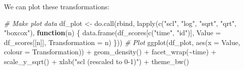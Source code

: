\documentclass[
  man,floatsintext]{apa6}
\newenvironment{Shaded}{\begin{snugshade}}{\end{snugshade}}
\newcommand{\AttributeTok}[1]{\textcolor[rgb]{0.77,0.63,0.00}{#1}}
\newcommand{\CommentTok}[1]{\textcolor[rgb]{0.56,0.35,0.01}{\textit{#1}}}
\newcommand{\ControlFlowTok}[1]{\textcolor[rgb]{0.13,0.29,0.53}{\textbf{#1}}}
\newcommand{\DecValTok}[1]{\textcolor[rgb]{0.00,0.00,0.81}{#1}}
\newcommand{\FunctionTok}[1]{\textcolor[rgb]{0.00,0.00,0.00}{#1}}
\newcommand{\NormalTok}[1]{#1}
\newcommand{\OtherTok}[1]{\textcolor[rgb]{0.56,0.35,0.01}{#1}}
\newcommand{\SpecialCharTok}[1]{\textcolor[rgb]{0.00,0.00,0.00}{#1}}
\newcommand{\StringTok}[1]{\textcolor[rgb]{0.31,0.60,0.02}{#1}}
\begin{document}
\begin{Shaded}
\end{Shaded}

We can plot these transformations:

\begin{Shaded}
\begin{Highlighting}[]
\CommentTok{\# Make plot data}
\NormalTok{df\_plot }\OtherTok{\textless{}{-}} \FunctionTok{do.call}\NormalTok{(rbind, }\FunctionTok{lapply}\NormalTok{(}\FunctionTok{c}\NormalTok{(}\StringTok{"scl"}\NormalTok{, }\StringTok{"log"}\NormalTok{, }\StringTok{"sqrt"}\NormalTok{, }\StringTok{"qrt"}\NormalTok{,}
    \StringTok{"boxcox"}\NormalTok{), }\ControlFlowTok{function}\NormalTok{(n) \{}
    \FunctionTok{data.frame}\NormalTok{(df\_scores[}\FunctionTok{c}\NormalTok{(}\StringTok{"time"}\NormalTok{, }\StringTok{"id"}\NormalTok{)], }\AttributeTok{Value =}\NormalTok{ df\_scores[[n]],}
        \AttributeTok{Transformation =}\NormalTok{ n)}
\NormalTok{\}))}
\CommentTok{\# Plot}
\FunctionTok{ggplot}\NormalTok{(df\_plot, }\FunctionTok{aes}\NormalTok{(}\AttributeTok{x =}\NormalTok{ Value, }\AttributeTok{colour =}\NormalTok{ Transformation)) }\SpecialCharTok{+} \FunctionTok{geom\_density}\NormalTok{() }\SpecialCharTok{+}
    \FunctionTok{facet\_wrap}\NormalTok{(}\SpecialCharTok{\textasciitilde{}}\NormalTok{time) }\SpecialCharTok{+} \FunctionTok{scale\_y\_sqrt}\NormalTok{() }\SpecialCharTok{+} \FunctionTok{xlab}\NormalTok{(}\StringTok{"scl (rescaled to 0{-}1)"}\NormalTok{) }\SpecialCharTok{+}
    \FunctionTok{theme\_bw}\NormalTok{()}
\end{Highlighting}
\end{Shaded}
\end{document}
